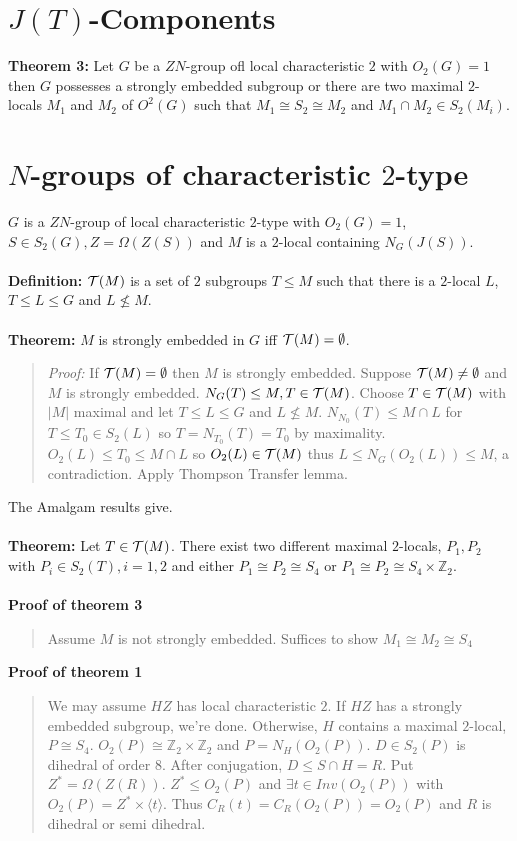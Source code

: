\section{$J(T)$-Components}
{\bf Theorem 3:}  Let $G$ be a $ZN$-group ofl local characteristic $2$ with $O_2(G)=1$ then
$G$ possesses a strongly embedded subgroup or there are two maximal $2$-locals $M_1$ and $M_2$
of $O^2(G)$ such that $M_1 \cong S_2 \cong M_2$ and $M_1 \cap M_2 \in S_2(M_i)$.

\section{$N$-groups of characteristic $2$-type}
$G$ is a $ZN$-group of local characteristic $2$-type with $O_2(G)=1$, $S \in S_2(G), Z = \Omega(Z(S))$
and $M$ is a $2$-local containing $N_G(J(S))$.
\\
\\
{\bf Definition:}  ${\cal T}(M)$ is a set of $2$ subgroups $T \leq M$ such that
there is a $2$-local $L$, $T \leq L \leq G$ and $L \not\leq M$.
\\
\\
{\bf Theorem:} $M$ is strongly embedded in $G$ iff ${\cal T}(M)= \emptyset$.
\begin{quote}
\emph{Proof:} If ${\cal T}(M)= \emptyset$ then $M$ is strongly embedded.  
Suppose ${\cal T}(M) \neq \emptyset$ and $M$ is strongly embedded.  $N_G(T) \leq M, T \in {\cal T}(M)$.
Choose $T \in {\cal T}(M)$ with $|M|$ maximal and let $T \leq L \leq G$ and $L \not\leq M$.
$N_{N_0}(T) \leq M \cap L$ for $T \leq T_0 \in S_2(L)$ so $T=N_{T_0}(T)=T_0$ by maximality.
$O_2(L) \leq T_0 \leq M \cap L$ so $O_2(L) \in {\cal T}(M)$ thus $L \leq N_G(O_2(L)) \leq M$, a contradiction.
Apply Thompson Transfer lemma.
\end{quote}
The Amalgam results give.\\
\\
{\bf Theorem:} Let $T \in {\cal T}(M)$.  There exist two different maximal $2$-locals, $P_1 , P_2$ with
$P_i \in S_2(T), i = 1, 2$ and either $P_1 \cong P_2 \cong S_4$ or $P_1 \cong P_2 \cong S_4 \times {\mathbb Z}_2$.
\\
\\
{\bf Proof of theorem 3}
\begin{quote}
Assume $M$ is not strongly embedded. Suffices to show $M_1 \cong M_2 \cong S_4$
\end{quote}
{\bf Proof of theorem 1}
\begin{quote}
We may assume $HZ$ has local characteristic $2$.  If $HZ$ has a strongly embedded subgroup, we're done.  Otherwise,
$H$ contains a maximal $2$-local, $P \cong S_4$.  $O_2(P) \cong {\mathbb Z}_2 \times {\mathbb Z}_2$ and $P= N_H(O_2(P))$.
$D \in S_2(P)$ is dihedral of order $8$.  After conjugation, $D \leq S \cap H = R$. Put $Z^*= \Omega(Z(R))$. 
$Z^* \leq O_2(P)$ and $\exists t \in Inv(O_2(P))$ with $O_2(P) = Z^* \times \langle t \rangle$.  Thus
$C_R(t) = C_R(O_2(P)) = O_2(P)$ and $R$ is dihedral or semi dihedral.
\end{quote}
